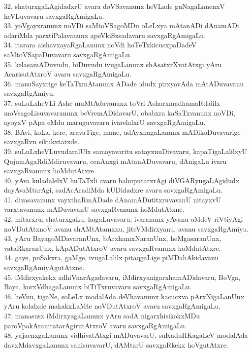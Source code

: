\documentclass{article}
\begin{document}
32. shaturxgaLAgidadxrU avara doVSavanunx heVLade guNagaLanenxV heVLuvavaru savxgaRgAmigaLu.\\
33. yoVgayxranunx noVDi saMtoVSagoMDu oLeLxya mAtanADi dAnamADi adariMda parxtiPalavanunx apeVkiSxsadavaru savxgaRgAmigaLu.\\
34. itarara aishavxayaRgaLanunx noVdi hoTeTxkicucxpaDadeV saMtoVSapaDuvavaru savxgaRgAmigaLu.\\
35. kelasamADuvudu, biDuvudu ivugaLanunx shAsatxrXvatAtxgi yAru AcarisutAtxroV avaru savxgaRgAmigaLu.\\
36. manuSayxrige keTaTxmAtanunx ADade idudx pirxyavAda mAtADuvavanu savxgaRgAmiyu.\\
37. suLuLxheVLi Ashe muMtAduvanunx toVri AsharxmadhamaRdalilx moVsagoLisuvavaranunx beVremADidavarU, obabxra kaSaTxvanunx noVDi, ayoyxV pApa eMdu maruguvavaru ivarelalxrU savxgaRgAmigaLu.\\
38. BAvi, koLa, kere, aravaTige, mane, udAyxnagaLanunx mADikoDuvavarige savxgaRvu sikukxtatxde.\\
39. suLuLxheVLuvudaralUlx samayavaritu satayxnuDivavaru, kapaTigaLalilxyU QujumAgaRdiMdiruvavaru, cenAnxgi mAtanADuvavaru, dAnigaLu ivaru savxgaRvanunx hoMdutAtxre.\\
40. yAva kuladalelxV huTaTxli avaru bahuputarxrAgi diVGARyugaLAgidudx dayAvaMtarAgi, sadAcAradiMda kUDidadxre avaru savxgaRgAmigaLu.\\
41. divasavanunx vayxthaRmADade dAnamADutitxruvavanU nitayxvU varxtavanunx mADuvavanU savxgaRvanunx hoMdutAtxne.\\
42. mitarxru, shaturxgaLu, hogaLuvavaru, ivaranunx yAvanu oMdeV riVtiyAgi noVDutAtxnoV avanu shAMtAtamxnu, jiteVMdirxyanu, avanu savxgaRgAmiyu.\\
43. yAru BayagoMDavaranUnx, bArxhamxNaranUnx, heMgasaranUnx, vataRkaranUnx, kApADutAtxroV avaru savxgaRvanunx hoMdutAtxre.\\
44. gaye, puSakxra, gaMge, ivugaLalilx pitaqgaLige piMDahAkidavanu savxgaRgAmiyAgutAtxne.\\
45. iMdirxyakekx adhiVnarAgadavaru, iMdirxyanigarxhamADidavaru, BoVga, Baya, korxVdhagaLanunx biTiTxruvavaru savxgaRgAmigaLu.\\
46. heVnu, tigaNe, soLeLx modalAda deVhavanunx kacucxva pArxNigaLanUnx yAru kolalxde makakxLaMte noVDutAtxroV avaru savxgaRgAmigaLu.\\
47. manasusx iMdirxyagaLanunx yAru sadA nigarxhisikokxMDu paroVpakAraniratarAgirutAtxroV avaru savxgaRgAmigaLu.\\
48. yajacnxgaLanunx vidhivatAtxgi mADuvavarU, suKaduHKagaLeV modalAda davxMdavxgaLanunx sahisuvavarU, dAMtarU savxgaRkekx hoVgutAtxre.\\
\end{document}
